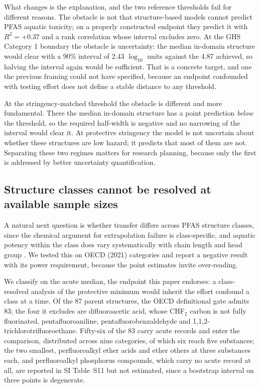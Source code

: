 \documentclass[preprint,12pt]{elsarticle}
\begin{document}
What changes is the explanation, and the two reference thresholds fail for
different reasons. The obstacle is not that structure-based models cannot
predict PFAS aquatic toxicity; on a properly constructed endpoint they predict
it with $R^2=+0.37$ and a rank correlation whose interval excludes zero. At the
GHS Category 1 boundary the obstacle is uncertainty: the median in-domain
structure would clear with a 90\% interval of 2.43 $\log_{10}$ units against the
4.87 achieved, so halving the interval again would be sufficient. That is a
concrete target, and one the previous framing could not have specified, because
an endpoint confounded with testing effort does not define a stable distance to
any threshold.

At the stringency-matched threshold the obstacle is different and more
fundamental. There the median in-domain structure has a point prediction
\emph{below} the threshold, so the required half-width is negative and no
narrowing of the interval would clear it. At protective stringency the model is
not uncertain about whether these structures are low hazard; it predicts that
most of them are not. Separating these two regimes matters for research
planning, because only the first is addressed by better uncertainty
quantification.

\subsection{Structure classes cannot be resolved at available sample sizes}

A natural next question is whether transfer differs across PFAS structure
classes, since the chemical argument for extrapolation failure is
class-specific, and aquatic potency within the class does vary systematically
with chain length and head group
\cite{conder2008pfca,brendel2018short,gomis2018potency}. We tested this on OECD (2021) categories and report a negative
result with its power requirement, because the point estimates invite
over-reading.

We classify on the acute median, the endpoint this paper endorses: a
class-resolved analysis of the protective minimum would inherit the effort
confound a class at a time. Of the 87 parent structures, the OECD definitional
gate admits 83; the four it excludes are difluoroacetic acid, whose CHF$_2$
carbon is not fully fluorinated, pentafluoroaniline, pentafluorobenzaldehyde and
1,1,2-trichlorotrifluoroethane. Fifty-six of the 83 carry acute records and
enter the comparison, distributed across nine categories, of which six reach
five substances; the two smallest, perfluoroalkyl ether acids and ether others
at three substances each, and perfluoroalkyl phosphorus compounds, which carry
no acute record at all, are reported in SI Table~S11 but not estimated, since a
bootstrap interval on three points is degenerate.
\end{document}
